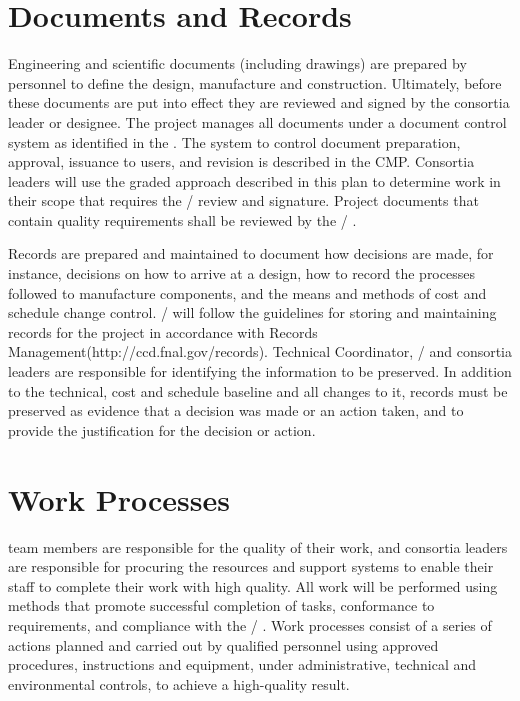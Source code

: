 \section{Documents and Records}

Engineering and scientific documents (including drawings) are prepared
by  personnel to define the design, manufacture and
construction. Ultimately, before these documents are put into effect
they are reviewed and signed by the  consortia leader or
designee. The  project manages all documents under
a document control system as identified in the 
.  The system to control document preparation, approval,
issuance to users, and revision is described in the CMP. Consortia
leaders will use the graded approach described in this plan to
determine work in their scope that requires the
/  review and signature. Project
documents that contain quality requirements shall be reviewed by the
/ .

Records are prepared and maintained to document how decisions are
made, for instance, decisions on how to arrive at a design, how to
record the processes followed to manufacture components, and the means
and methods of cost and schedule change control. / will follow
the guidelines for storing and maintaining records for the project in
accordance with \fnal Records
Management(http://ccd.fnal.gov/records).  Technical Coordinator,
/  and consortia leaders are responsible for
identifying the information to be preserved. In addition to the
technical, cost and schedule baseline and all changes to it, records
must be preserved as evidence that a decision was made or an action
taken, and to provide the justification for the decision or action.

\section{Work Processes}

 team members are responsible for the quality of their work, and
consortia leaders are responsible for procuring the resources and
support systems to enable their staff to complete their work with high
quality. All  work will be performed using methods that promote
successful completion of tasks, conformance to  requirements, and
compliance with the / . Work processes
consist of a series of actions planned and carried out by qualified
personnel using approved procedures, instructions and equipment, under
administrative, technical and environmental controls, to achieve a
high-quality result.

